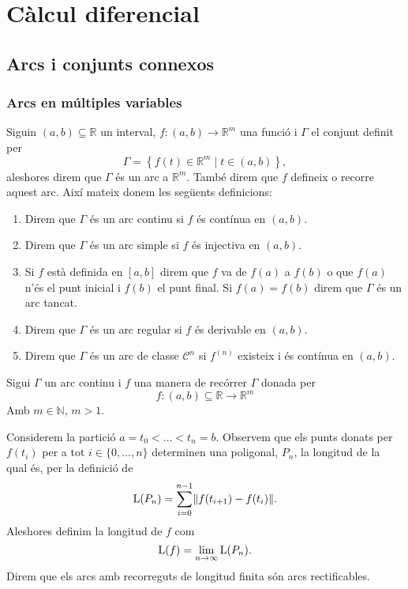 \documentclass[../Apunts.tex]{subfiles}
\begin{document}
	\chapter{Càlcul diferencial}
	\section{Arcs i conjunts connexos}
	\subsection{Arcs en múltiples variables}
	\begin{definition}
		\label{def:arc}
		\label{def:arc continu}
		\label{def:arc simple}
		\label{def:arc tancat}
		\label{def:arc regular}
		\label{def:arc de classe de diferenciabilitat n}
		Siguin \((a,b)\subseteq\mathbb{R}\) un interval, \(f\colon(a,b)\to\mathbb{R}^{m}\) una funció i \(\Gamma\) el conjunt definit per
		\[\Gamma=\left\{f(t)\in\mathbb{R}^{m}\mid t\in(a,b)\right\},\]
		aleshores direm que \(\Gamma\) és un arc a \(\mathbb{R}^{m}\). També direm que \(f\) defineix o recorre aquest arc.
		Així mateix donem les següents definicions:
		\begin{enumerate}
			\item Direm que \(\Gamma\) és un arc continu si \(f\) és contínua en \((a,b)\).
			\item Direm que \(\Gamma\) és un arc simple si \(f\) és injectiva en \((a,b)\).
			\item Si \(f\) està definida en \([a,b]\) direm que \(f\) va de \(f(a)\) a \(f(b)\) o que \(f(a)\) n'és el punt inicial i \(f(b)\) el punt final. Si \(f(a)=f(b)\) direm que \(\Gamma\) és un arc tancat.
			\item Direm que \(\Gamma\) és un arc regular si \(f\) és derivable en \((a,b)\).
			\item Direm que \(\Gamma\) és un arc de classe \(\mathcal{C}^{n}\) si \(f^{(n)}\) existeix i és contínua en \((a,b)\).
		\end{enumerate}
	\end{definition}
	\begin{definition}
		\label{def:long recorregut arc continu}
		Sigui \(\Gamma\) un arc continu i \(f\) una manera de recórrer \(\Gamma\) donada per
		\[f\colon(a,b)\subseteq\mathbb{R}\longrightarrow\mathbb{R}^{m}\]
		Amb \(m\in\mathbb{N}\), \(m>1\).
		
		Considerem la partició \(a=t_{0}<\dots<t_{n}=b\). Observem que els punts donats per \(f(t_{i})\) per a tot \(i\in\{0,\dots,n\}\) determinen una poligonal, \(P_{n}\), la longitud de la qual és, per la definició de 
		\[\Long(P_{n})=\sum_{i=0}^{n-1}\norm{f(t_{i+1})-f(t_{i})}.\]
		Aleshores definim la longitud de \(f\) com
		\[\operatorname{L}(f)=\lim_{n\to\infty}\operatorname{L}(P_{n}).\]
		Direm que els arcs amb recorreguts de longitud finita són arcs rectificables.
	\end{definition}
\end{document}

